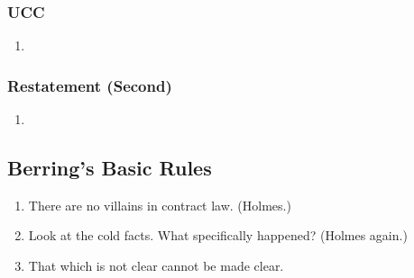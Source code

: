 
\subsubsection{UCC}

\begin{enumerate}
    \item %
\end{enumerate}

\subsubsection{Restatement (Second)}

\begin{enumerate}
    \item %
\end{enumerate}

\subsection{Berring's Basic Rules}

\begin{enumerate}
    \item There are no villains in contract law. (Holmes.)
    \item Look at the cold facts. What specifically happened? (Holmes again.)
    \item That which is not clear cannot be made clear.
\end{enumerate}

